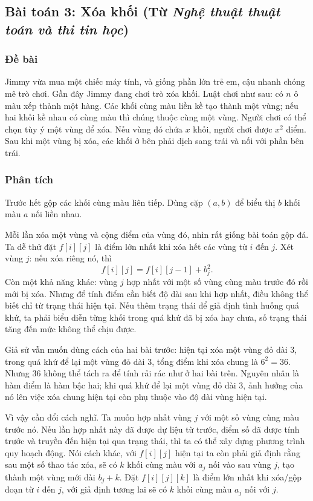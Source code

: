 \documentclass[11pt]{article}
\begin{document}
\subsection{Bài toán 3: Xóa khối (Từ \textit{Nghệ thuật thuật toán và thi tin học})}

\subsubsection*{Đề bài}

Jimmy vừa mua một chiếc máy tính, và giống phần lớn trẻ em, cậu nhanh chóng mê
trò chơi. Gần đây Jimmy đang chơi trò xóa khối. Luật chơi như sau: có $n$ ô
màu xếp thành một hàng. Các khối cùng màu liền kề tạo thành một vùng; nếu hai
khối kề nhau có cùng màu thì chúng thuộc cùng một vùng. Người chơi có thể chọn
tùy ý một vùng để xóa. Nếu vùng đó chứa $x$ khối, người chơi được $x^2$ điểm.
Sau khi một vùng bị xóa, các khối ở bên phải dịch sang trái và nối với phần
bên trái.

\subsubsection*{Phân tích}

Trước hết gộp các khối cùng màu liên tiếp. Dùng cặp $(a,b)$ để biểu thị $b$
khối màu $a$ nối liền nhau.

Mỗi lần xóa một vùng và cộng điểm của vùng đó, nhìn rất giống bài toán gộp đá.
Ta dễ thử đặt $f[i][j]$ là điểm lớn nhất khi xóa hết các vùng từ $i$ đến $j$.
Xét vùng $j$: nếu xóa riêng nó, thì
\[
  f[i][j]=f[i][j-1]+b_j^2.
\]
Còn một khả năng khác: vùng $j$ hợp nhất với một số vùng cùng màu trước đó rồi
mới bị xóa. Nhưng để tính điểm cần biết độ dài sau khi hợp nhất, điều không
thể biết chỉ từ trạng thái hiện tại. Nếu thêm trạng thái để giả định tình
huống quá khứ, ta phải biểu diễn từng khối trong quá khứ đã bị xóa hay chưa,
số trạng thái tăng đến mức không thể chịu được.

Giả sử vẫn muốn dùng cách của hai bài trước: hiện tại xóa một vùng đỏ dài $3$,
trong quá khứ để lại một vùng đỏ dài $3$, tổng điểm khi xóa chung là
$6^2=36$. Nhưng $36$ không thể tách ra để tính rải rác như ở hai bài trên.
Nguyên nhân là hàm điểm là hàm bậc hai; khi quá khứ để lại một vùng đỏ dài
$3$, ảnh hưởng của nó lên việc xóa chung hiện tại còn phụ thuộc vào độ dài
vùng hiện tại.

Vì vậy cần đổi cách nghĩ. Ta muốn hợp nhất vùng $j$ với một số vùng cùng màu
trước nó. Nếu lần hợp nhất này đã được dự liệu từ trước, điểm số đã được tính
trước và truyền đến hiện tại qua trạng thái, thì ta có thể xây dựng phương
trình quy hoạch động. Nói cách khác, với $f[i][j]$ hiện tại ta còn phải giả
định rằng sau một số thao tác xóa, sẽ có $k$ khối cùng màu với $a_j$ nối vào
sau vùng $j$, tạo thành một vùng mới dài $b_j+k$. Đặt
$f[i][j][k]$ là điểm lớn nhất khi xóa/gộp đoạn từ $i$ đến $j$, với giả định
tương lai sẽ có $k$ khối cùng màu $a_j$ nối với $j$.
\end{document}
